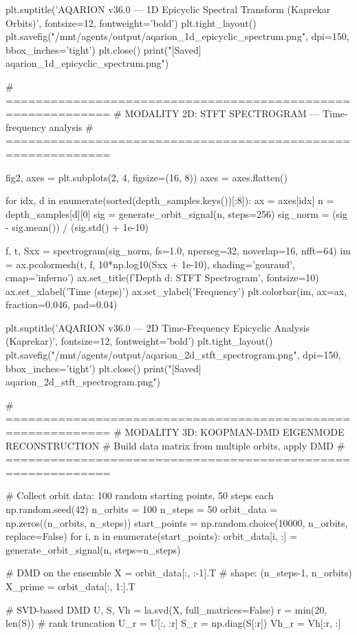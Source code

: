 {{{{{{{{{{{{{plt.suptitle('AQARION v36.0 — 1D Epicyclic Spectral Transform (Kaprekar Orbits)', 
             fontsize=12, fontweight='bold')
plt.tight_layout()
plt.savefig("/mnt/agents/output/aqarion_1d_epicyclic_spectrum.png", dpi=150, bbox_inches='tight')
plt.close()
print("[Saved] aqarion_1d_epicyclic_spectrum.png")

# ============================================================
# MODALITY 2D: STFT SPECTROGRAM — Time-frequency analysis
# ============================================================

fig2, axes = plt.subplots(2, 4, figsize=(16, 8))
axes = axes.flatten()

for idx, d in enumerate(sorted(depth_samples.keys())[:8]):
    ax = axes[idx]
    n = depth_samples[d][0]
    sig = generate_orbit_signal(n, steps=256)
    sig_norm = (sig - sig.mean()) / (sig.std() + 1e-10)
    
    f, t, Sxx = spectrogram(sig_norm, fs=1.0, nperseg=32, noverlap=16, nfft=64)
    im = ax.pcolormesh(t, f, 10*np.log10(Sxx + 1e-10), shading='gouraud', cmap='inferno')
    ax.set_title(f'Depth {d}: STFT Spectrogram', fontsize=10)
    ax.set_xlabel('Time (steps)')
    ax.set_ylabel('Frequency')
    plt.colorbar(im, ax=ax, fraction=0.046, pad=0.04)

plt.suptitle('AQARION v36.0 — 2D Time-Frequency Epicyclic Analysis (Kaprekar)', 
             fontsize=12, fontweight='bold')
plt.tight_layout()
plt.savefig("/mnt/agents/output/aqarion_2d_stft_spectrogram.png", dpi=150, bbox_inches='tight')
plt.close()
print("[Saved] aqarion_2d_stft_spectrogram.png")

# ============================================================
# MODALITY 3D: KOOPMAN-DMD EIGENMODE RECONSTRUCTION
# Build data matrix from multiple orbits, apply DMD
# ============================================================

# Collect orbit data: 100 random starting points, 50 steps each
np.random.seed(42)
n_orbits = 100
n_steps = 50
orbit_data = np.zeros((n_orbits, n_steps))
start_points = np.random.choice(10000, n_orbits, replace=False)
for i, n in enumerate(start_points):
    orbit_data[i, :] = generate_orbit_signal(n, steps=n_steps)

# DMD on the ensemble
X = orbit_data[:, :-1].T  # shape: (n_steps-1, n_orbits)
X_prime = orbit_data[:, 1:].T

# SVD-based DMD
U, S, Vh = la.svd(X, full_matrices=False)
r = min(20, len(S))  # rank truncation
U_r = U[:, :r]
S_r = np.diag(S[:r])
Vh_r = Vh[:r, :]

}}}}}}}}}}}}}
